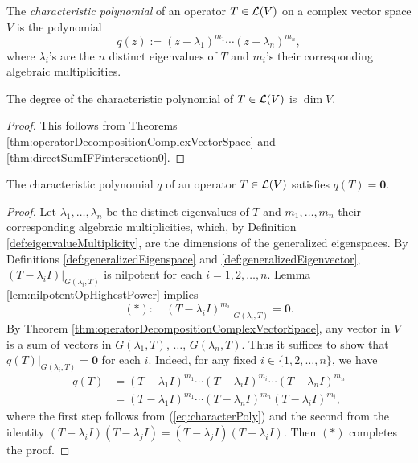 \begin{defn}
  \label{def:characterPoly}
  The \emph{characteristic polynomial} of an operator
  $T\in{\cal L}(V)$ on a complex vector space $V$
  is the polynomial
  \begin{equation}
    \label{eq:characterPoly}
    q(z) := (z-\lambda_1)^{m_1}\cdots(z-\lambda_n)^{m_n},
  \end{equation}
  where $\lambda_i$'s are the $n$ distinct eigenvalues of $T$
  and $m_i$'s their corresponding algebraic multiplicities. 
\end{defn}

\begin{coro}
  \label{coro:degreeOfCharacterPoly}
  The degree of the characteristic polynomial of $T\in{\cal L}(V)$ 
  is $\dim V$. 
\end{coro}
\begin{proof}
  This follows from Theorems
  \ref{thm:operatorDecompositionComplexVectorSpace}
  and \ref{thm:directSumIFFintersection0}. 
\end{proof}

\begin{thm}
  \label{thm:Cayley-Hamilton}
  The characteristic polynomial $q$ of an operator $T\in{\cal L}(V)$
  satisfies $q(T)=\mathbf{0}$.
\end{thm}
\begin{proof}
  Let $\lambda_1, \ldots, \lambda_n$ be the distinct eigenvalues of $T$
  and $m_1, \ldots, m_n$ their corresponding algebraic multiplicities, 
  which, by Definition \ref{def:eigenvalueMultiplicity},
  are the dimensions of the generalized eigenspaces.
  By Definitions \ref{def:generalizedEigenspace}
  and \ref{def:generalizedEigenvector},
  $(T-\lambda_iI)|_{G(\lambda_i,T)}$ is nilpotent
  for each $i=1, 2, \ldots, n$.
  Lemma \ref{lem:nilpotentOpHighestPower} implies
  \begin{displaymath}
    (*):\quad (T-\lambda_iI)^{m_i}|_{G(\lambda_i,T)}=\mathbf{0}.
  \end{displaymath}
%
  By Theorem \ref{thm:operatorDecompositionComplexVectorSpace},
  any vector in $V$ is a sum of vectors in
  $G(\lambda_1,T)$, $\ldots$, $G(\lambda_n,T)$.
  Thus it suffices to show that $q(T)|_{G(\lambda_i,T)}=\mathbf{0}$
  for each $i$.
  Indeed, for any fixed $i\in\{1, 2, \ldots, n\}$, we have
  \begin{displaymath}
    \begin{array}{rl}
      q(T)
      &= (T-\lambda_1I)^{m_1}\cdots(T-\lambda_iI)^{m_i}\cdots(T-\lambda_nI)^{m_n}
      \\
      &= (T-\lambda_1I)^{m_1}\cdots(T-\lambda_nI)^{m_n}(T-\lambda_iI)^{m_i}, 
    \end{array}
  \end{displaymath}
  where the first step follows from (\ref{eq:characterPoly})
  and the second from the identity
  $(T-\lambda_iI)(T-\lambda_jI)=(T-\lambda_jI)(T-\lambda_iI)$.
  Then $(*)$ completes the proof.
\end{proof}

